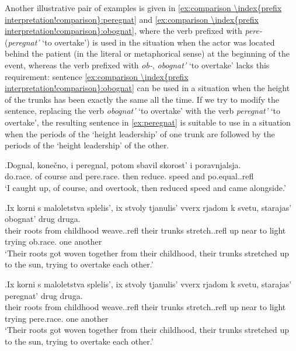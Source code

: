 Another illustrative pair of examples is given in \ref{ex:comparison \index{prefix interpretation!comparison}:peregnat} and \ref{ex:comparison \index{prefix interpretation!comparison}:obognat}, where the verb prefixed with \textit{pere-}   (\textit{peregnat'} `to overtake') is used in the situation when the actor was located behind the patient (in the literal or metaphorical sense) at the beginning of the event, whereas the verb prefixed with {\textit{ob-},} \textit{obognat'} `to overtake' lacks this requirement: sentence \ref{ex:comparison \index{prefix interpretation!comparison}:obognat} can be used in a situation when the height of the trunks has been exactly the same all the time. If we try to modify the sentence, replacing the verb \textit{obognat'} `to overtake' with the verb \textit{peregnat'} `to overtake', the resulting sentence in \ref{ex:peregnat} is suitable to use in a situation when the periods of the `height leadership' of one trunk are followed by the periods of the `height leadership' of the other.

\exg.\label{ex:comparison \index{prefix interpretation!comparison}:peregnat}Dognal, kone\v{c}no, i peregnal, potom sbavil skorost' i poravnjalsja.\\
do.race. {of course} and pere.race. then reduce. speed and po.equal..refl\\
\trans `I caught up, of course, and overtook, then reduced speed and came alongside.'

\exg.\label{ex:comparison \index{prefix interpretation!comparison}:obognat}Ix korni s maloletstva splelis', ix stvoly tjanulis' vverx rjadom k svetu, starajas' obognat' drug druga.\\
their roots from childhood weave..refl their trunks stretch..refl up near to light trying ob.race. one another\\
\trans `Their roots got woven together from their childhood, their trunks stretched up to the sun, trying to overtake each other.'\\

\exg.\label{ex:peregnat}Ix korni s maloletstva splelis', ix stvoly tjanulis' vverx rjadom k svetu, starajas' peregnat' drug druga.\\
their roots from childhood weave..refl their trunks stretch..refl up near to light trying pere.race. one another\\
\trans `Their roots got woven together from their childhood, their trunks stretched up to the sun, trying to overtake each other.'

